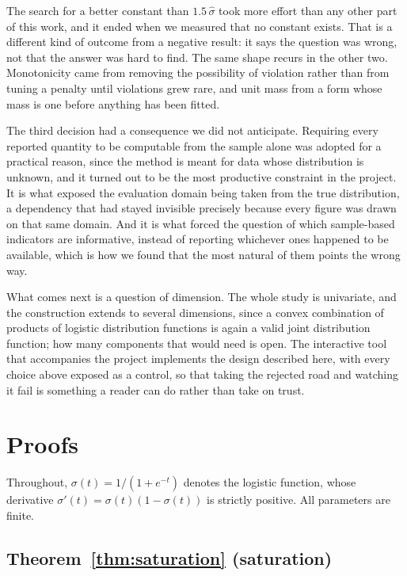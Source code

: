 \documentclass[11pt]{article}
\newcommand{\shat}{\hat{\sigma}}
\begin{document}
The search for a better constant than $1.5\,\shat$ took more effort than any other part of
this work, and it ended when we measured that no constant exists. That is a different kind of
outcome from a negative result: it says the question was wrong, not that the answer was hard
to find. The same shape recurs in the other two. Monotonicity came from removing the
possibility of violation rather than from tuning a penalty until violations grew rare, and
unit mass from a form whose mass is one before anything has been fitted.

The third decision had a consequence we did not anticipate. Requiring every reported quantity
to be computable from the sample alone was adopted for a practical reason, since the method is
meant for data whose distribution is unknown, and it turned out to be the most productive
constraint in the project. It is what exposed the evaluation domain being taken from the true
distribution, a dependency that had stayed invisible precisely because every figure was drawn
on that same domain. And it is what forced the question of which sample-based indicators are
informative, instead of reporting whichever ones happened to be available, which is how we
found that the most natural of them points the wrong way.

What comes next is a question of dimension. The whole study is univariate, and the
construction extends to several dimensions, since a convex combination of products of logistic
distribution functions is again a valid joint distribution function; how many components that
would need is open. The interactive tool that accompanies the project implements the design
described here, with every choice above exposed as a control, so that taking the rejected road
and watching it fail is something a reader can do rather than take on trust.

\appendix
\section{Proofs}
\label{app:proofs}

Throughout, $\sigma(t) = 1/(1 + e^{-t})$ denotes the logistic function, whose derivative
$\sigma'(t) = \sigma(t)(1 - \sigma(t))$ is strictly positive. All parameters are finite.

\subsection*{Theorem~\ref{thm:saturation} (saturation)}
\end{document}
